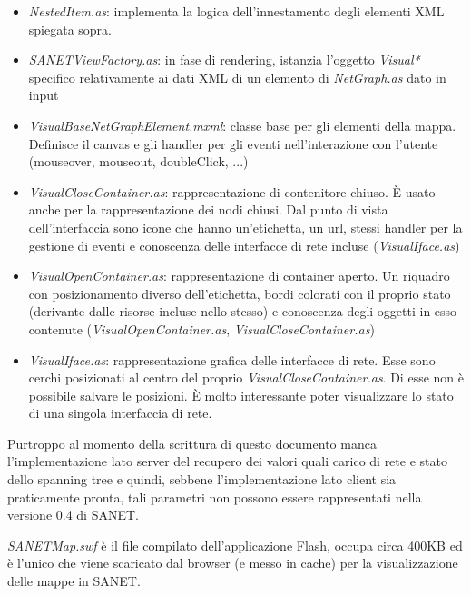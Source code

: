 \documentclass[a4wide,10pt,italian]{manual}
\begin{document}
\begin{itemize}
\item {} 
\emph{NestedItem.as}: implementa la logica dell'innestamento degli elementi XML spiegata sopra.

\item {} 
\emph{SANETViewFactory.as}: in fase di rendering, istanzia l'oggetto \emph{Visual*} specifico relativamente ai dati XML di un elemento di \emph{NetGraph.as} dato in input

\item {} 
\emph{VisualBaseNetGraphElement.mxml}: classe base per gli elementi della mappa. Definisce il canvas e gli handler per gli eventi nell'interazione con l'utente (mouseover, mouseout, doubleClick, ...)

\item {} 
\emph{VisualCloseContainer.as}: rappresentazione di contenitore chiuso. È usato anche per la rappresentazione dei nodi chiusi. Dal punto di vista dell'interfaccia sono icone che hanno un'etichetta, un url, stessi handler per la gestione di eventi e conoscenza delle interfacce di rete incluse (\emph{VisualIface.as})

\item {} 
\emph{VisualOpenContainer.as}: rappresentazione di container aperto. Un riquadro con posizionamento diverso dell'etichetta, bordi colorati con il proprio stato (derivante dalle risorse incluse nello stesso) e conoscenza degli oggetti in esso contenute (\emph{VisualOpenContainer.as}, \emph{VisualCloseContainer.as})

\item {} 
\emph{VisualIface.as}: rappresentazione grafica delle interfacce di rete. Esse sono cerchi posizionati al centro del proprio \emph{VisualCloseContainer.as}. Di esse non è possibile salvare le posizioni. È molto interessante poter visualizzare lo stato di una singola interfaccia di rete.

\end{itemize}

Purtroppo al momento della scrittura di questo documento manca l'implementazione lato server del recupero dei valori quali carico di rete e stato dello spanning tree e quindi, sebbene l'implementazione lato client sia praticamente pronta, tali parametri non possono essere rappresentati nella versione 0.4 di SANET.

\emph{SANETMap.swf} è il file compilato dell'applicazione Flash, occupa circa 400KB
ed è l'unico che viene scaricato dal browser (e messo in cache) per la visualizzazione delle mappe in SANET.
\end{document}
